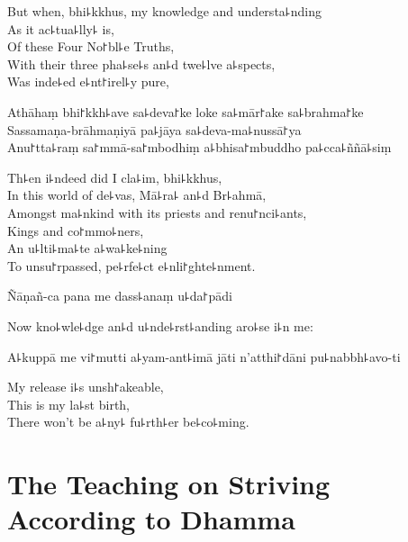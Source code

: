 \clearpage

\begin{english}
  But when, bhi꜕kkhus, my knowledge and understa꜕nding\\
  As it ac꜕tua꜕lly꜕ is,\\
  Of these Four No꜓bl꜕e Truths,\\
  With their three pha꜕se꜕s an꜕d twe꜕lve a꜕spects,\\
  Was inde꜕ed e꜕nt꜓irel꜕y pure,
\end{english}

Athāhaṃ bhi꜓kkh꜕ave sa꜕deva꜓ke loke sa꜕mār꜓ake sa꜕brahma꜓ke\\
Sassamaṇa-brāhmaṇiyā pa꜕jāya sa꜕deva-ma꜕nussā꜓ya\\
Anu꜓tta꜕raṃ sa꜓mmā-sa꜓mbodhiṃ a꜕bhisa꜓mbuddho pa꜕cca꜕ññā꜕siṃ

\begin{english}
  Th꜕en i꜕ndeed did I cla꜕im, bhi꜕kkhus,\\
  In this world of de꜕vas, Mā꜕ra꜕ an꜕d Br꜕ahmā,\\
  Amongst ma꜕nkind with its priests and renu꜓nci꜕ants,\\
  Kings and co꜓mmo꜕ners,\\
  An u꜕lti꜕ma꜕te a꜕wa꜕ke꜕ning\\
  To unsu꜓rpassed, pe꜕rfe꜕ct e꜕nli꜓ghte꜕nment.
\end{english}

Ñāṇañ-ca pana me dass꜕anaṃ u꜕da꜓pādi

\begin{english}
  Now kno꜕wle꜕dge an꜕d u꜕nde꜕rst꜕anding aro꜕se i꜕n me:
\end{english}

A꜕kuppā me vi꜓mutti a꜕yam-ant꜕imā jāti n'atthi꜓dāni pu꜕nabbh꜕avo-ti

\begin{english}
  My release i꜕s unsh꜓akeable,\\
  This is my la꜕st birth,\\
  There won't be a꜕ny꜕ fu꜕rth꜕er be꜕co꜕ming.
\end{english}

\chapter[Striving According to Dhamma]{The Teaching on Striving According to Dhamma}%


\begin{leader}
\end{leader}

